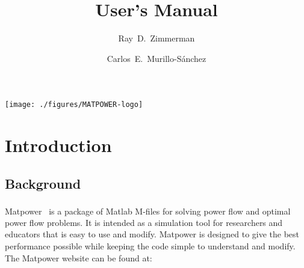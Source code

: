 \documentclass[12pt]{article}
\title{User's Manual}
\author{Ray~D.~Zimmerman \and Carlos~E.~Murillo-S\'anchez}
\newcommand{\mpver}[0]{6.1-dev}
\newcommand{\matlab}[0]{{\sc Matlab}}
\newcommand{\matpower}[0]{{\sc Matpower}}
\numberwithin{equation}{section}
\numberwithin{table}{section}
\numberwithin{figure}{section}
\begin{document}
\makeatletter
\makeatother
\thispagestyle{empty}
\newpage

\thispagestyle{empty}
\newpage

\setcounter{page}{1} %

\clearpage
\tableofcontents
\clearpage
\listoffigures
\listoftables

\clearpage
\begin{center}
\noindent\texttt{[image: ./figures/MATPOWER-logo]}
\end{center}
\section{Introduction}

\subsection{Background}

\matpower{}~\cite{zimmerman2011} is a package of \matlab{}\textsuperscript{\tiny \textregistered} M-files for solving power flow and optimal power flow problems. It is intended as a simulation tool for researchers and educators that is easy to use and modify. \matpower{} is designed to give the best performance possible while keeping the code simple to understand and modify. The \matpower{} website can be found at:
\end{document}
